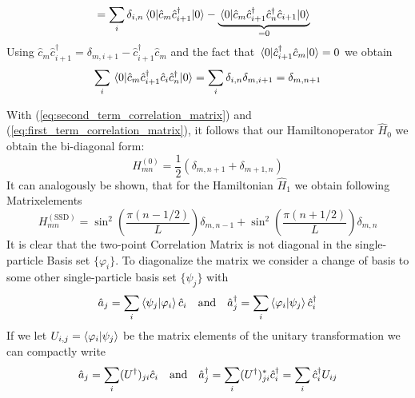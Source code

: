 \documentclass[11pt, a4paper]{article}
\theoremstyle{definition} %
\begin{document}
\begin{itemize}
\begin{align}
	 		&=  \sum_i \delta_{i,n}\mel{0}{\hat{c}_m \hat{c}_{i+1}^\dagger }{0} - \underbrace{\mel{0}{\hat{c}_m \hat{c}_{i+1}^\dagger \hat{c}_n^\dagger\hat{c}_{i+1}}{0}}_{=0}
	 	\end{align}
	 	Using $\hat{c}_m \hat{c}_{i+1}^\dagger = \delta_{m, i+1} - \hat{c}_{i+1}^\dagger \hat{c}_m$ and the fact that $\mel{0}{\hat{c}_{i+1}^\dagger \hat{c}_m}{0} = 0$ we obtain
	 	\begin{equation}
	 		\sum_i \mel{0}{\hat{c}_m \hat{c}_{i+1}^\dagger \hat{c}_i \hat{c}_n^\dagger}{0} = \sum_{i} \delta_{i,n} \delta_{m, i+1} = \delta_{m, n+1}
	 		\label{eq:second_term_correlation_matrix}
	 	\end{equation}
	 \end{itemize}
	 With (\ref{eq:second_term_correlation_matrix}) and (\ref{eq:first_term_correlation_matrix}), it follows that our Hamiltonoperator $\hat{H}_0$ we obtain the bi-diagonal form:
	 \begin{equation}
	 	H^{(0)}_{mn} = \frac{1}{2} \left(\delta_{m, n+1} + \delta_{m+1, n}\right)
	 \end{equation}
	 It can analogously be shown, that for the Hamiltonian $\hat{H}_1$ we obtain following Matrixelements
	 \begin{equation}
	 	H_{mn}^{(\text{SSD})} = \sin^2\left(\frac{\pi(n-1/2)}{L}\right) \delta_{m,n-1} + \sin^2\left(\frac{\pi(n+1/2)}{L}\right) \delta_{m,n}
	 \end{equation}
	 It is clear that the two-point Correlation Matrix is not diagonal in the single-particle Basis set $\{ \varphi_i \}$. To diagonalize the matrix we consider a change of basis to some other single-particle basis set $\{\psi_j\}$ with
	 \begin{equation}
	 	\hat{a}_j = \sum_i \braket{\psi_j}{\varphi_i} \hat{c}_i \qq{and} \hat{a}_j^\dagger =\sum_i \braket{\varphi_i}{\psi_j} \hat{c}_i^\dagger
	 \end{equation}
	 If we let $U_{i,j} = \braket{\varphi_i}{\psi_j}$ be the matrix elements of the unitary transformation we can compactly write
	 \begin{equation}
	 	\hat{a}_j = \sum_i (U^\dagger)_{ji} \hat{c}_i \qq{and} \hat{a}_j^\dagger = \sum_i (U^\dagger)^*_{ji} \hat{c}_i^\dagger =\sum_{i}  \hat{c}_i^\dagger U_{ij}
	 \end{equation}
	 
	 
	 
\end{document}
